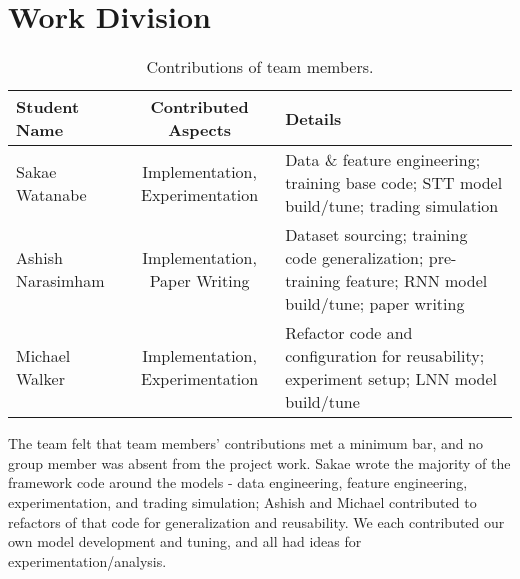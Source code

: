 \documentclass[10pt,twocolumn,letterpaper]{article}
\begin{document}
\clearpage
\section{Work Division}

\begin{table*}
\begin{center}
\begin{tabular}{|l|c|p{8cm}|}
\hline
Student Name & Contributed Aspects & Details \\
\hline\hline
Sakae Watanabe & Implementation, Experimentation & Data \& feature engineering; training base code; STT model build/tune; trading simulation\\
Ashish Narasimham & Implementation, Paper Writing & Dataset sourcing; training code generalization; pre-training feature; RNN model build/tune; paper writing \\
Michael Walker & Implementation, Experimentation & Refactor code and configuration for reusability; experiment setup; LNN model build/tune \\
\hline
\end{tabular}
\end{center}
\caption{Contributions of team members.}
\label{tab:contributions}
\end{table*}

The team felt that team members’ contributions met a minimum bar, and no group member was absent from the project work. Sakae wrote the majority of the framework code around the models - data engineering, feature engineering, experimentation, and trading simulation; Ashish and Michael contributed to refactors of that code for generalization and reusability. We each contributed our own model development and tuning, and all had ideas for experimentation/analysis.
\end{document}
